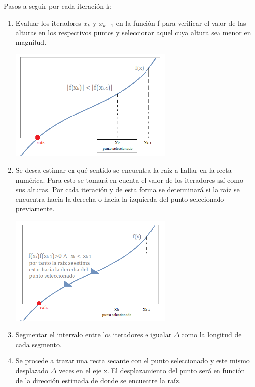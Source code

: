 \documentclass[11pt]{article}
\begin{document}
{\large Pasos a seguir por cada iteración k:}
\begin{enumerate}
	\item[\textperiodcentered] Evaluar los iteradores $x_k$ y $x_{k-1}$ en la función f para verificar el valor de las alturas en los respectivos puntos y seleccionar aquel cuya altura sea menor en magnitud.
	
\vspace{0.25cm}
\begin{center}
\includegraphics[keepaspectratio, width=8cm]{I.png}
\end{center}
\vspace{0.25cm}

	\item[\textperiodcentered] Se desea estimar en qué sentido se encuentra la raiz a hallar en la recta numérica. Para esto se tomará en cuenta el valor de los iteradores así como sus alturas. Por cada iteración y de esta forma se determinará si la raíz se encuentra hacia la derecha o hacia la izquierda del punto selecionado previamente.
	
\vspace{0.25cm}
\begin{center}
\includegraphics[keepaspectratio, width=8cm]{II.png}
\end{center}
\vspace{0.25cm}


	\item[\textperiodcentered] Segmentar el intervalo entre los iteradores e igualar $\Delta$ como la longitud de cada segmento.
	\item[\textperiodcentered] Se procede a trazar una recta secante con el punto seleccionado y este mismo desplazado $\Delta$ veces en el eje x. El desplazamiento del punto será en función de la dirección estimada de donde se encuentre la raíz.
	

\end{enumerate}
\end{document}
